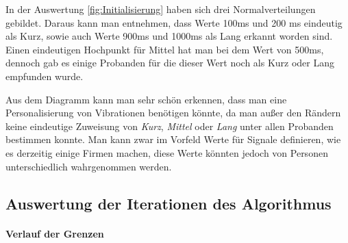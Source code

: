 
In der Auswertung \autoref{fig:Initialisierung} haben sich drei Normalverteilungen gebildet. 
Daraus kann man entnehmen, dass Werte 100ms und  200 ms eindeutig als Kurz, sowie auch Werte 900ms und 1000ms als Lang erkannt worden sind. 
Einen eindeutigen Hochpunkt f{\"u}r Mittel hat man bei dem Wert von 500ms, dennoch gab es einige Probanden f{\"u}r die dieser Wert noch als Kurz oder Lang empfunden wurde. 

Aus dem Diagramm kann man sehr sch{\"o}n erkennen, dass man eine Personalisierung von Vibrationen ben{\"o}tigen k{\"o}nnte, da man au{\ss}er den R{\"a}ndern keine eindeutige Zuweisung von \textit{Kurz}, \textit{Mittel} oder \textit{Lang} unter allen Probanden bestimmen konnte. 
Man kann zwar im Vorfeld Werte f{\"u}r Signale definieren, wie es derzeitig einige Firmen machen, diese Werte k{\"o}nnten jedoch von Personen unterschiedlich wahrgenommen werden.

\subsection{Auswertung der Iterationen des Algorithmus}


\paragraph{Verlauf der Grenzen}

